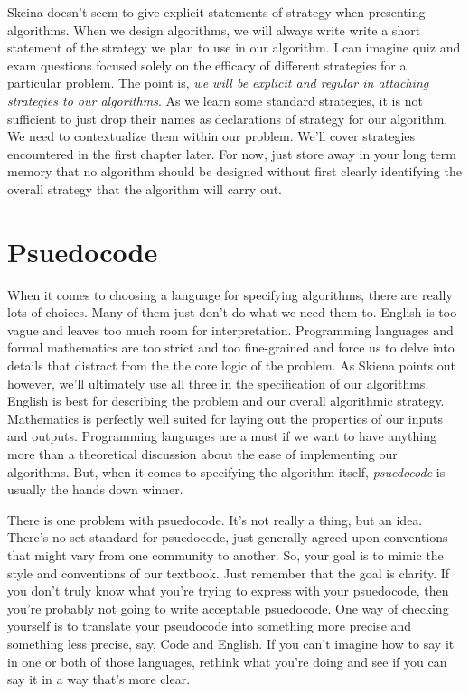 \documentclass[]{tufte-handout}
\begin{document}
Skeina doesn't seem to give explicit statements of strategy when presenting algorithms.  When we design algorithms, we will always write  write a short statement of the strategy we plan to use in our algorithm.  I can imagine quiz and exam questions focused solely on the efficacy of different strategies for a particular problem. The point is, \textit{we will be explicit and regular in attaching strategies to our algorithms}. As we learn some standard strategies, it is not sufficient to just drop their names as declarations of strategy for our algorithm. We need to contextualize them within our problem. We'll cover strategies encountered in the first chapter later. For now, just store away in your long term memory that no algorithm should be designed without first clearly identifying the overall strategy that the algorithm will carry out.

\section{Psuedocode}

When it comes to choosing a language for specifying algorithms, there are really lots of choices.  Many of them just don't do what we need them to. English is too vague and leaves too much room for interpretation. Programming languages and formal mathematics are too strict and too fine-grained and force us to delve into details that distract from the the core logic of the problem. As Skiena points out however, we'll ultimately use all three in the specification of our algorithms.  English is best for describing the problem and our overall algorithmic strategy.  Mathematics is perfectly well suited for laying out the properties of our inputs and outputs.  Programming languages are a must if we want to have anything more than a theoretical discussion about the ease of implementing our algorithms.  But, when it comes to specifying the algorithm itself, \textit{psuedocode} is usually the hands down winner. 

There is one problem with psuedocode. It's not really a thing, but an idea. There's no set standard for psuedocode, just generally agreed upon conventions that might vary from one community to another. So, your goal is to mimic the style and conventions of our textbook. Just remember that the goal is clarity. If you don't truly know what you're trying to express with your psuedocode, then you're probably not going to write acceptable psuedocode.  One way of checking yourself is to translate your pseudocode into something more precise and something less precise, say, Code and English. If you can't imagine how to say it in one or both of those languages, rethink what you're doing and see if you can say it in a way that's more clear.
\end{document}

